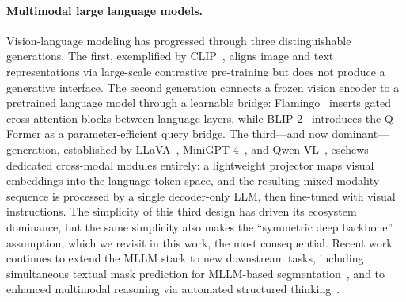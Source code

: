 \documentclass[a4paper,fleqn,review]{cas-sc}
\begin{document}
\paragraph{Multimodal large language models.}
Vision-language modeling has progressed through three distinguishable
generations. The first, exemplified by CLIP~\citep{radford2021clip},
aligns image and text representations via large-scale contrastive
pre-training but does not produce a generative interface. The second
generation connects a frozen vision encoder to a pretrained language
model through a learnable bridge: Flamingo~\citep{alayrac2022flamingo}
inserts gated cross-attention blocks between language layers, while
BLIP-2~\citep{li2023blip2} introduces the Q-Former as a
parameter-efficient query bridge. The third---and now dominant---%
generation, established by LLaVA~\citep{liu2024llava, liu2024llava15},
MiniGPT-4~\citep{zhu2023minigpt4}, and
Qwen-VL~\citep{bai2023qwenvl}, eschews dedicated cross-modal modules
entirely: a lightweight projector maps visual embeddings into the
language token space, and the resulting mixed-modality sequence is
processed by a single decoder-only LLM, then fine-tuned with visual
instructions. The simplicity of this third design has driven its
ecosystem dominance, but the same simplicity also makes the
``symmetric deep backbone'' assumption, which we revisit in this
work, the most consequential.
Recent work continues to extend the MLLM stack to new downstream
tasks, including simultaneous textual mask prediction for
MLLM-based segmentation~\citep{liu2025better}, and to enhanced
multimodal reasoning via automated structured
thinking~\citep{wu2026astar}.
\end{document}
